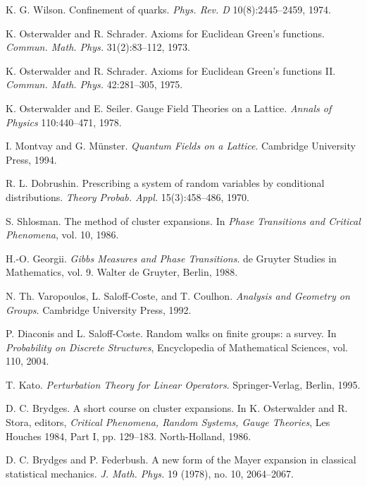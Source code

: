 \documentclass[11pt]{amsart}
\begin{document}
\begin{thebibliography}{99}

K. G. Wilson.
Confinement of quarks.
\emph{Phys. Rev. D} 10(8):2445--2459, 1974.

K. Osterwalder and R. Schrader.
Axioms for Euclidean Green's functions.
\emph{Commun. Math. Phys.} 31(2):83--112, 1973.

K. Osterwalder and R. Schrader.
Axioms for Euclidean Green's functions II.
\emph{Commun. Math. Phys.} 42:281--305, 1975.

K. Osterwalder and E. Seiler.
Gauge Field Theories on a Lattice.
\emph{Annals of Physics} 110:440--471, 1978.

I. Montvay and G. Münster.
\emph{Quantum Fields on a Lattice}.
Cambridge University Press, 1994.

R. L. Dobrushin.
Prescribing a system of random variables by conditional distributions.
\emph{Theory Probab. Appl.} 15(3):458--486, 1970.

S. Shlosman.
The method of cluster expansions.
In \emph{Phase Transitions and Critical Phenomena}, vol. 10, 1986.

H.-O. Georgii.
\emph{Gibbs Measures and Phase Transitions}.
de Gruyter Studies in Mathematics, vol. 9. Walter de Gruyter, Berlin, 1988.

N. Th. Varopoulos, L. Saloff-Coste, and T. Coulhon.
\emph{Analysis and Geometry on Groups}.
Cambridge University Press, 1992.

P. Diaconis and L. Saloff-Coste.
Random walks on finite groups: a survey.
In \emph{Probability on Discrete Structures}, Encyclopedia of Mathematical Sciences, vol. 110, 2004.

T. Kato.
\emph{Perturbation Theory for Linear Operators}.
Springer-Verlag, Berlin, 1995.

D. C. Brydges.
A short course on cluster expansions.
In K. Osterwalder and R. Stora, editors, \emph{Critical Phenomena, Random Systems, Gauge Theories},
Les Houches 1984, Part I, pp. 129--183. North-Holland, 1986.

D. C. Brydges and P. Federbush.
A new form of the Mayer expansion in classical statistical mechanics.
\emph{J. Math. Phys.} 19 (1978), no. 10, 2064--2067.


\end{thebibliography}
\end{document}
